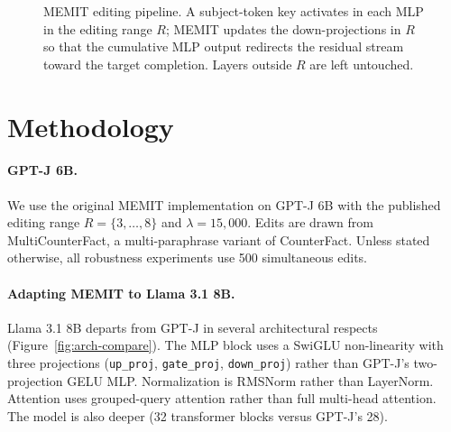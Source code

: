 \documentclass[11pt]{article}
\begin{document}
\begin{figure}[t]
\centering
{}
\caption{MEMIT editing pipeline. A subject-token key activates in each MLP in the editing range $R$; MEMIT updates the down-projections in $R$ so that the cumulative MLP output redirects the residual stream toward the target completion. Layers outside $R$ are left untouched.}
\label{fig:memit-overview}
\end{figure}

\section{Methodology}
\label{sec:methodology}

\paragraph{GPT-J 6B.}
We use the original MEMIT implementation on GPT-J 6B with the published editing range $R = \{3, \dots, 8\}$ and $\lambda = 15{,}000$. Edits are drawn from MultiCounterFact, a multi-paraphrase variant of CounterFact. Unless stated otherwise, all robustness experiments use 500 simultaneous edits.

\paragraph{Adapting MEMIT to Llama 3.1 8B.}
Llama 3.1 8B departs from GPT-J in several architectural respects (Figure~\ref{fig:arch-compare}). The MLP block uses a SwiGLU non-linearity with three projections (\texttt{up\_proj}, \texttt{gate\_proj}, \texttt{down\_proj}) rather than GPT-J's two-projection GELU MLP. Normalization is RMSNorm rather than LayerNorm. Attention uses grouped-query attention rather than full multi-head attention. The model is also deeper (32 transformer blocks versus GPT-J's 28).
\end{document}
